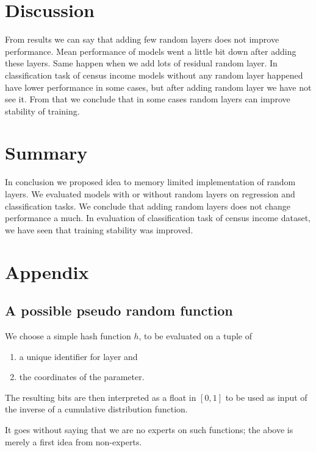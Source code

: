 \documentclass[]{article}
\begin{document}
\begin{multicols}{2}
	\section{Discussion}
	From results we can say that adding few random layers does not improve performance. Mean performance of models went a little bit down after adding these layers. Same happen when we add lots of residual random layer. In classification task of census income models without any random layer happened have lower performance in some cases, but after adding random layer we have not see it. From that we conclude that in some cases random layers can improve stability of training.
	
	\section{Summary}
	In conclusion we proposed idea to memory limited implementation of random layers. We evaluated models with or without random layers on regression and classification tasks. We conclude that adding random layers does not change performance a much. In evaluation of classification task of census income dataset, we have seen that training stability was improved.
	
	\appendix
	\section{Appendix}
	\subsection{A possible pseudo random function}
	We choose a simple hash function $h$, to be evaluated on a tuple of
	\begin{enumerate}
		\itemsep0em
		\item a unique identifier for layer and
		\item the coordinates of the parameter.
	\end{enumerate}
	The resulting bits are then interpreted as a float in $[0, 1]$ to be used as input of the inverse of a cumulative distribution function.

	It goes without saying that we are no experts on such functions; the above is merely a first idea from non-experts.

	
	
\end{multicols}
\end{document}
